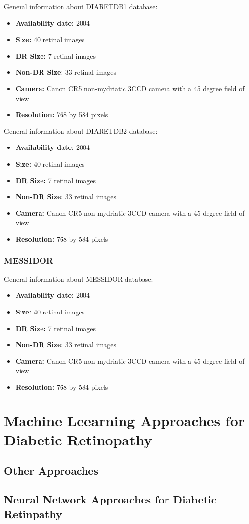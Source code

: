 General information about DIARETDB1 database:
\begin{itemize}
    \item \textbf{Availability date: } 2004
    \item \textbf{Size: } 40 retinal images
    \item \textbf{DR Size: } 7 retinal images
    \item \textbf{Non-DR Size: } 33 retinal images
    \item \textbf{Camera: } Canon CR5 non-mydriatic 3CCD camera with a 45 degree field of view
    \item \textbf{Resolution: } 768 by 584 pixels
\end{itemize}

General information about DIARETDB2 database:
\begin{itemize}
    \item \textbf{Availability date: } 2004
    \item \textbf{Size: } 40 retinal images
    \item \textbf{DR Size: } 7 retinal images
    \item \textbf{Non-DR Size: } 33 retinal images
    \item \textbf{Camera: } Canon CR5 non-mydriatic 3CCD camera with a 45 degree field of view
    \item \textbf{Resolution: } 768 by 584 pixels
\end{itemize}

\subsubsection{MESSIDOR}
General information about MESSIDOR database:
\begin{itemize}
    \item \textbf{Availability date: } 2004
    \item \textbf{Size: } 40 retinal images
    \item \textbf{DR Size: } 7 retinal images
    \item \textbf{Non-DR Size: } 33 retinal images
    \item \textbf{Camera: } Canon CR5 non-mydriatic 3CCD camera with a 45 degree field of view
    \item \textbf{Resolution: } 768 by 584 pixels
\end{itemize}

\section{Machine Leearning Approaches for Diabetic Retinopathy}
\subsection{Other Approaches}
\subsection{Neural Network Approaches for Diabetic Retinpathy}
